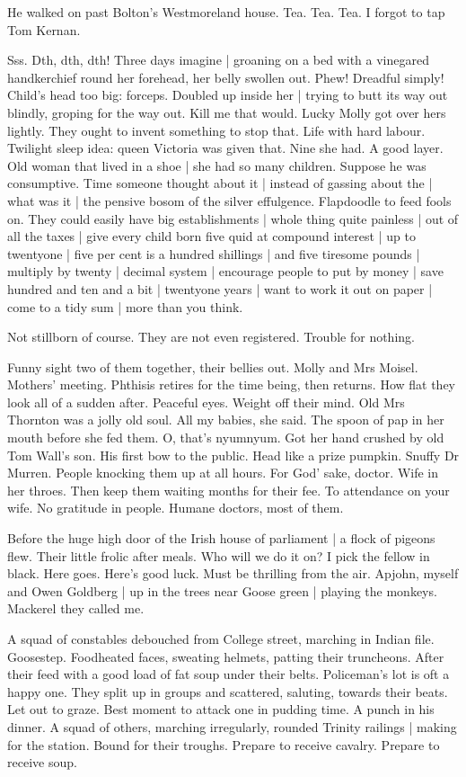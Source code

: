 He walked on past Bolton's Westmoreland house.
Tea.
Tea.
Tea.
I forgot to tap Tom Kernan.

Sss.
Dth, dth, dth!
Three days imagine |
groaning on a bed with a vinegared handkerchief round her forehead,
her belly swollen out.
Phew!
Dreadful simply!
Child's head too big:
forceps.
Doubled up inside her |
trying to butt its way out blindly,
groping for the way out.
Kill me that would.
Lucky Molly got over hers lightly.
They ought to invent something to stop that.
Life with hard labour.
Twilight sleep idea:
queen Victoria
was given that.
Nine she had.
A good layer.
Old woman that lived in a shoe |
she had so many children.
Suppose he was consumptive.
Time someone thought about it |
instead of gassing about the |
what was it |
the pensive bosom of the silver effulgence.
Flapdoodle to feed fools on.
They could easily have big establishments |
whole thing quite painless |
out of all the taxes |
give every child born five quid at compound interest |
up to twentyone |
five per cent is a hundred shillings |
and five tiresome pounds |
multiply by twenty |
decimal system |
encourage people to put by money |
save hundred and ten and a bit |
twentyone years |
want to work it out on paper |
come to a tidy sum |
more than you think.

Not stillborn of course.
They are not even registered.
Trouble for nothing.%

Funny sight two of them together,
their bellies out.
Molly and Mrs Moisel.
Mothers' meeting.
Phthisis retires for the time being,
then returns.
How flat they look all of a sudden after.
Peaceful eyes.
Weight off their mind.
Old Mrs Thornton was a jolly old soul.
All my babies,
she said.
The spoon of pap in her mouth before she fed them.
O, that's nyumnyum.
Got her hand crushed by old Tom Wall's son.
His first bow to the public.
Head like a prize pumpkin.
Snuffy Dr Murren.
People knocking them up at all hours.
For God' sake, doctor.
Wife in her throes.
Then keep them waiting months for their fee.
To attendance on your wife.
No gratitude in people.
Humane doctors,
most of them.

Before the huge high door of the Irish house of parliament |
a flock of pigeons flew.
Their little frolic after meals.
Who will we do it on?
I pick the fellow in black.
Here goes.
Here's good luck.
Must be thrilling from the air.
Apjohn, myself and Owen Goldberg |
up in the trees near Goose green |
playing the monkeys.
Mackerel they called me.

A squad of constables debouched from College street,
marching in Indian file.
Goosestep.
Foodheated faces,
sweating helmets,
patting their truncheons.
After their feed with a good load of fat soup under their belts.
Policeman's lot is oft a happy one.
They split up in groups and scattered,
saluting,
towards their beats.
Let out to graze.
Best moment to attack one in pudding time.
A punch in his dinner.
A squad of others,
marching irregularly,
rounded Trinity railings |
making for the station.
Bound for their troughs.
Prepare to receive cavalry.
Prepare to receive soup.

